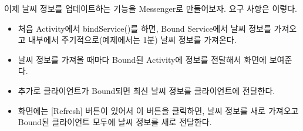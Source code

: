 이제 날씨 정보를 업데이트하는 기능을 Messenger로 만들어보자. 요구 사항은 이렇다.
\begin{itemize}
\item 처음 Activity에서 bindService()를 하면, Bound Service에서 날씨 정보를 가져오고 내부에서 주기적으로(예제에서는 1분) 날씨 정보를 가져온다.
\item 날씨 정보를 가져올 때마다 Bound된 Activity에 정보를 전달해서 화면에 보여준다.
\item 추가로 클라이언트가 Bound되면 최신 날씨 정보를 클라이언트에 전달한다.
\item 화면에는 [Refresh] 버튼이 있어서 이 버튼을 클릭하면, 날씨 정보를 새로 가져오고 Bound된 클라이언트 모두에 날씨 정보를 새로 전달한다.
\end{itemize}

